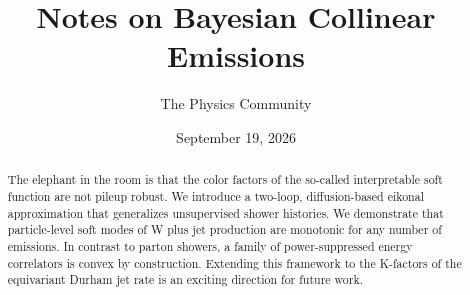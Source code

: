 \documentclass[11pt]{article}
\title{Notes on Bayesian Collinear Emissions}
\author{The Physics Community}
\date{September 19, 2026}
\numberwithin{equation}{section}
\theoremstyle{definition}
\theoremstyle{remark}
\begin{document}
\maketitle
\begin{abstract}
The elephant in the room is that the color factors of the so-called
interpretable soft function are not pileup robust. We introduce a
two-loop, diffusion-based eikonal approximation that generalizes
unsupervised shower histories. We demonstrate that particle-level soft
modes of W plus jet production are monotonic for any number of
emissions. In contrast to parton showers, a family of power-suppressed
energy correlators is convex by construction. Extending this framework
to the K-factors of the equivariant Durham jet rate is an exciting
direction for future work.
\end{abstract}
\tableofcontents





\nocite{*}


\end{document}
